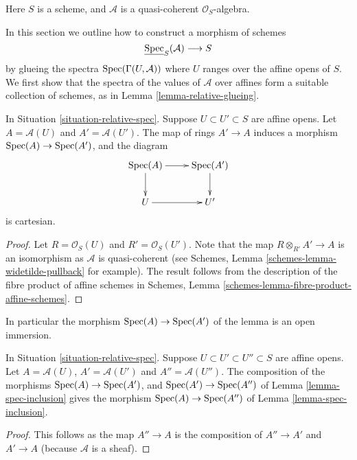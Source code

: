 \begin{situation}
\label{situation-relative-spec}
Here $S$ is a scheme, and $\mathcal{A}$
is a quasi-coherent $\mathcal{O}_S$-algebra.
\end{situation}

\noindent
In this section we outline how to construct a morphism
of schemes
$$
\underline{\mathop{\rm Spec}}_S(\mathcal{A}) \longrightarrow S
$$
by glueing the spectra $\mathop{\rm Spec}(\Gamma(U, \mathcal{A}))$
where $U$ ranges over the affine opens of $S$. We first show that the
spectra of the values of $\mathcal{A}$ over affines form a
suitable collection of schemes, as in Lemma \ref{lemma-relative-glueing}.

\begin{lemma}
\label{lemma-spec-inclusion}
In Situation \ref{situation-relative-spec}.
Suppose $U \subset U' \subset S$ are affine opens.
Let $A = \mathcal{A}(U)$ and $A' = \mathcal{A}(U')$.
The map of rings $A' \to A$ induces a morphism
$\mathop{\rm Spec}(A) \to \mathop{\rm Spec}(A')$, and the diagram
$$
\xymatrix{
\Spec(A) \ar[r] \ar[d] &
\Spec(A') \ar[d] \\
U \ar[r] &
U'
}
$$
is cartesian.
\end{lemma}

\begin{proof}
Let $R = \mathcal{O}_S(U)$ and $R' = \mathcal{O}_S(U')$.
Note that the map $R \otimes_{R'} A' \to A$ is an isomorphism as
$\mathcal{A}$ is quasi-coherent
(see Schemes, Lemma \ref{schemes-lemma-widetilde-pullback} for example).
The result follows from the description of the fibre product of
affine schemes in
Schemes, Lemma \ref{schemes-lemma-fibre-product-affine-schemes}.
\end{proof}

\noindent
In particular the morphism $\mathop{\rm Spec}(A) \to \mathop{\rm Spec}(A')$
of the lemma is an open immersion.

\begin{lemma}
\label{lemma-transitive-spec}
In Situation \ref{situation-relative-spec}.
Suppose $U \subset U' \subset U'' \subset S$ are affine opens.
Let $A = \mathcal{A}(U)$, $A' = \mathcal{A}(U')$ and $A'' = \mathcal{A}(U'')$.
The composition of the morphisms
$\mathop{\rm Spec}(A) \to \mathop{\rm Spec}(A')$, and
$\mathop{\rm Spec}(A') \to \mathop{\rm Spec}(A'')$ of
Lemma \ref{lemma-spec-inclusion} gives the
morphism $\mathop{\rm Spec}(A) \to \mathop{\rm Spec}(A'')$
of Lemma \ref{lemma-spec-inclusion}.
\end{lemma}

\begin{proof}
This follows as the map $A'' \to A$ is the composition of $A'' \to A'$ and
$A' \to A$ (because $\mathcal{A}$ is a sheaf).
\end{proof}

